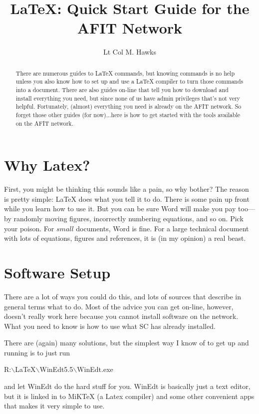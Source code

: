 \documentclass[10pt,journal]{ieeetran}
\title{LaTeX: Quick Start Guide for the AFIT Network}
\author{Lt Col M. Hawks}
\begin{document}
\maketitle

\begin{abstract}
There are numerous guides to LaTeX commands, but knowing commands
is no help unless you also know how to set up and use a LaTeX
compiler to turn those commands into a document.  There are also
guides on-line that tell you how to download and install
everything you need, but since none of us have admin privileges
that's not very helpful.  Fortunately, (almost) everything you
need is already on the AFIT network.  So forget those other guides
(for now)...here is how to get started with the tools available on
the AFIT network.
\end{abstract}

\section{Why Latex?}
First, you might be thinking this sounds like a pain, so why
bother? The reason is pretty simple: LaTeX does what you tell it
to do. There is some pain up front while you learn how to use it.
But you can be sure Word will make you pay too---by randomly
moving figures, incorrectly numbering equations, and so on. Pick
your poison. For $small$ documents, Word is fine. For a large
technical document with lots of equations, figures and references,
it is (in my opinion) a real beast.

\section{Software Setup}
There are a lot of ways you could do this, and lots of sources
that describe in general terms what to do.  Most of the advice you
can get on-line, however, doesn't really work here because you
cannot install software on the network.  What you need to know is
how to use what SC has already installed.

There are (again) many solutions, but the simplest way I know of
to get up and running is to just run
\begin{ttfamily}R:$\backslash$LaTeX$\backslash$WinEdt5.5$\backslash$WinEdt.exe\end{ttfamily} and
let WinEdt do the hard stuff for you.  WinEdt is basically just a
text editor, but it is linked in to MiKTeX (a Latex compiler) and
some other convenient apps that makes it very simple to use.
\end{document}
